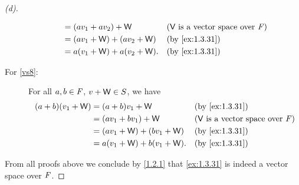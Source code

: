 \begin{proof}[(d)]
\begin{description}
\begin{align*}
                                   & = (av_1 + av_2) + \W         &  & \text{(\(\V\) is a vector space over \(\F\))} \\
                                   & = (av_1 + \W) + (av_2 + \W)  &  & \by{ex:1.3.31}                                \\
                                   & = a(v_1 + \W) + a(v_2 + \W). &  & \by{ex:1.3.31}
      \end{align*}
    \item[For \ref{vs8}:]
      For all \(a, b \in \mathit{F}\), \(v + \mathsf{W} \in S\), we have
      \begin{align*}
        (a + b) (v_1 + \W) & = (a + b) v_1 + \W           &  & \by{ex:1.3.31}                                \\
                           & = (av_1 + bv_1) + \W         &  & \text{(\(\V\) is a vector space over \(\F\))} \\
                           & = (av_1 + \W) + (bv_1 + \W)  &  & \by{ex:1.3.31}                                \\
                           & = a(v_1 + \W) + b(v_1 + \W). &  & \by{ex:1.3.31}
      \end{align*}
  \end{description}
  From all proofs above we conclude by \cref{1.2.1} that \cref{ex:1.3.31} is indeed a vector space over \(\mathit{F}\).
\end{proof}
